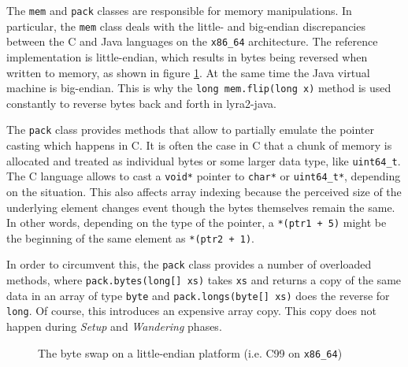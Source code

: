 The \texttt{mem} and \texttt{pack} classes are responsible for memory manipulations. In particular, the \texttt{mem} class deals with the little- and big-endian discrepancies between the C and Java languages on the \texttt{x86\_64} architecture. The reference implementation is little-endian, which results in bytes being reversed when written to memory, as shown in figure \ref{fig:little-endian}. At the same time the Java virtual machine is big-endian. This is why the \texttt{long mem.flip(long x)} method is used constantly to reverse bytes back and forth in lyra2-java.

The \texttt{pack} class provides methods that allow to partially emulate the pointer casting which happens in C. It is often the case in C that a chunk of memory is allocated and treated as individual bytes or some larger data type, like \texttt{uint64_t}. The C language allows to cast a \texttt{void*} pointer to \texttt{char*} or \texttt{uint64_t*}, depending on the situation. This also affects array indexing because the perceived size of the underlying element changes event though the bytes themselves remain the same. In other words, depending on the type of the pointer, a \texttt{*(ptr1 + 5)} might be the beginning of the same element as \texttt{*(ptr2 + 1)}.

In order to circumvent this, the \texttt{pack} class provides a number of overloaded methods, where \texttt{pack.bytes(long[] xs)} takes \texttt{xs} and returns a copy of the same data in an array of type \texttt{byte} and \texttt{pack.longs(byte[] xs)} does the reverse for \texttt{long}. Of course, this introduces an expensive array copy. This copy does not happen during \emph{Setup} and \emph{Wandering} phases.

\begin{figure}
    \centering
    \caption{The byte swap on a little-endian platform (i.e. C99 on \texttt{x86\_64})}
    \label{fig:little-endian}
  \end{figure}

